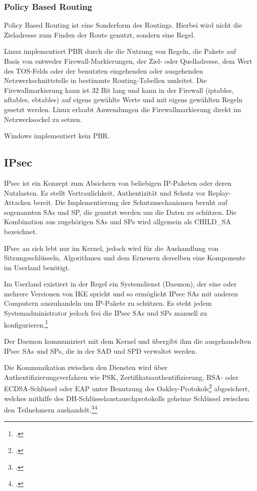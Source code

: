 \subsubsection{Policy Based Routing}
Policy Based Routing ist eine Sonderform des Routings. Hierbei wird nicht die Zieladresse
zum Finden der Route genutzt, sondern eine Regel.

Linux implementiert \ac{PBR} durch die die Nutzung von Regeln, die Pakete auf Basis von entweder Firewall-Markierungen, der Ziel- oder Quelladresse,
dem Wert des \ac{TOS}-Felds oder der benutzten eingehenden oder ausgehenden Netzwerkschnittstelle in bestimmte
Routing-Tabellen umleitet. 
Die Firewallmarkierung kann ist 32 Bit lang und kann in der Firewall (iptables, nftables, ebtables)
auf eigens gewählte Werte und mit eigens gewählten Regeln gesetzt werden.
Linux erlaubt Anwendungen die Firewallmarkierung direkt im Netzwerksockel zu setzen.


Windows implementiert kein \ac{PBR}.

\subsection{IPsec}
\ac{IPsec} ist ein Konzept zum Absichern von beliebigen \ac{IP}-Paketen oder deren Nutzlasten.
Es stellt Vertraulichkeit, Authentizität und Schutz vor Replay-Attacken bereit.
Die Implementierung der Schutzmechanismen beruht auf sogenannten \acp{SA} und \ac{SP},
die genutzt werden um die Daten zu schützen.
Die Kombination aus zugehörigen \acp{SA} und \acp{SP} wird allgemein als CHILD\_SA
bezeichnet.

\ac{IPsec} an sich lebt nur im Kernel, jedoch wird für die Aushandlung von Sitzungsschlüsseln,
Algorithmen und dem Erneuern derselben eine Komponente im Userland benötigt.

Im Userland existiert in der Regel ein Systemdienst (Daemon), der eine oder
mehrere Versionen von \ac{IKE} spricht und so ermöglicht \ac{IPsec} \acp{SA}
mit anderen Computern auszuhandeln um \ac{IP}-Pakete zu schützen.
Es steht jedem Systemadministrator jedoch frei die \ac{IPsec} \acp{SA} und \acp{SP}
manuell zu konfigurieren.\footcite[][18]{stephen_kent_rfc_2005}

Der Daemon kommuniziert mit dem Kernel und übergibt ihm die ausgehandelten \ac{IPsec}
\acp{SA} und \acp{SP}, die in der \ac{SAD} und \ac{SPD} verwaltet werden.

Die Kommunikation zwischen den Diensten wird über Authentifizierungsverfahren wie \ac{PSK},
Zertifikatsauthentifizierung, RSA- oder ECDSA-Schlüssel oder \ac{EAP} unter Benutzung 
des Oakley-Protokols\footcite{hilarie_k._orman_rfc_1998} abgesichert, welches mithilfe des \ac{DH}-Schlüsselaustauschprotokolls
geheime Schlüssel zwischen den Teilnehmern aushandelt.\footcite[][50]{charlie_kaufman_rfc_2014}\footcite[][8]{douglas_maughan_rfc_1998}

